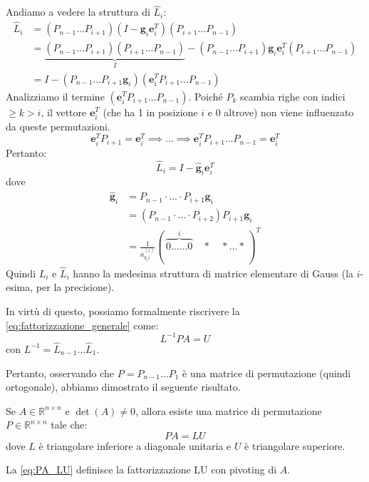 Andiamo a vedere la struttura di $\hat{L}_i$:
\begin{align*}
    \hat{L}_i &= (P_{n-1} \dots P_{i+1}) (I - \mathbf{g}_i \mathbf{e}_i^T) (P_{i+1} \dots P_{n-1}) \\
              &= \underbrace{(P_{n-1} \dots P_{i+1})(P_{i+1} \dots P_{n-1})}_{I} - (P_{n-1} \dots P_{i+1}) \mathbf{g}_i \mathbf{e}_i^T (P_{i+1} \dots P_{n-1}) \\
              &= I - (P_{n-1} \dots P_{i+1} \mathbf{g}_i) (\mathbf{e}_i^T P_{i+1} \dots P_{n-1})
\end{align*}
Analizziamo il termine $(\mathbf{e}_i^T P_{i+1} \dots P_{n-1})$. Poiché $P_k$ scambia righe con indici $\ge k > i$, il vettore $\mathbf{e}_i^T$ (che ha 1 in posizione $i$ e 0 altrove) non viene influenzato da queste permutazioni.
$$ \mathbf{e}_i^T P_{i+1} = \mathbf{e}_i^T \implies \dots \implies \mathbf{e}_i^T P_{i+1} \dots P_{n-1} = \mathbf{e}_i^T $$
Pertanto:
$$ \hat{L}_i = I - \hat{\mathbf{g}}_i \mathbf{e}_i^T $$
dove
\begin{align*}
    \hat{\mathbf{g}}_i &= P_{n-1} \cdot \dots \cdot P_{i+1} \mathbf{g}_i \\
    &= (P_{n-1} \cdot \dots \cdot P_{i+2}) P_{i+1} \mathbf{g}_i \\
    &= \frac{1}{a_{k_i i}^{(i)}} (\, \overbrace{0 \dots \dots 0}^{i} \quad * \quad * \dots * \, )^T
\end{align*}Quindi $L_i$ e $\hat{L}_i$ hanno la medesima struttura di matrice elementare di Gauss (la $i$-esima, per la precisione).

In virtù di questo, possiamo formalmente riscrivere la \eqref{eq:fattorizzazione_generale} come:
$$ L^{-1} P A = U $$
con $L^{-1} = \hat{L}_{n-1} \dots \hat{L}_1$.

Pertanto, osservando che $P = P_{n-1} \dots P_1$ è una matrice di permutazione (quindi ortogonale), abbiamo dimostrato il seguente risultato.

\begin{teorema}
Se $A \in \mathbb{R}^{n \times n}$ e $\det(A) \neq 0$, allora esiste una matrice di permutazione $P \in \mathbb{R}^{n \times n}$ tale che:
\begin{equation} \label{eq:PA_LU}
    P A = L U
\end{equation}
dove $L$ è triangolare inferiore a diagonale unitaria e $U$ è triangolare superiore.
\end{teorema}
La \eqref{eq:PA_LU} definisce la fattorizzazione LU con pivoting di $A$.

